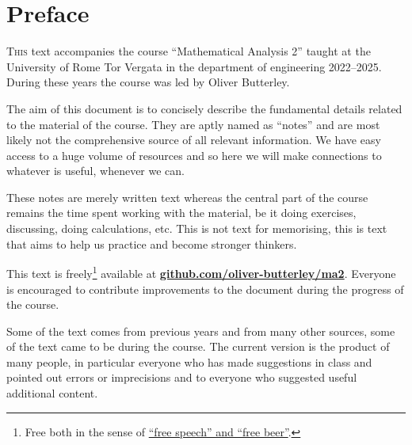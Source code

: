 \chapter{Preface}
\lettrine{T}{his} text accompanies the course ``Mathematical Analysis 2'' taught at the University of Rome Tor Vergata in the department of engineering 2022--2025.
During these years the course was led by Oliver Butterley. 

The aim of this document is to concisely describe the fundamental details related to the material of the course.
They are aptly named as ``notes'' and are most likely not the comprehensive source of all relevant information.
We have easy access to a huge volume of resources and so here we will make connections to whatever is useful, whenever we can. 

These notes are merely written text whereas the central part of the course remains the time spent working with the material, be it doing exercises, discussing, doing calculations, etc. This is not text for memorising, this is text that aims to help us practice and become stronger thinkers.

This text is freely\footnote{Free both in the sense of \href{https://en.wikipedia.org/wiki/Gratis_versus_libre}{``free speech'' and ``free beer''}.} available at \href{https://github.com/oliver-butterley/ma2}{\textbf{github.com/oliver-butterley/ma2}}.
Everyone is encouraged to contribute improvements to the document during the progress of the course. 

Some of the text comes from previous years and from many other sources, some of the text came to be during the course.
The current version is the product of many people, in particular everyone who has made suggestions in class and pointed out errors or imprecisions and to everyone who suggested useful additional content.


